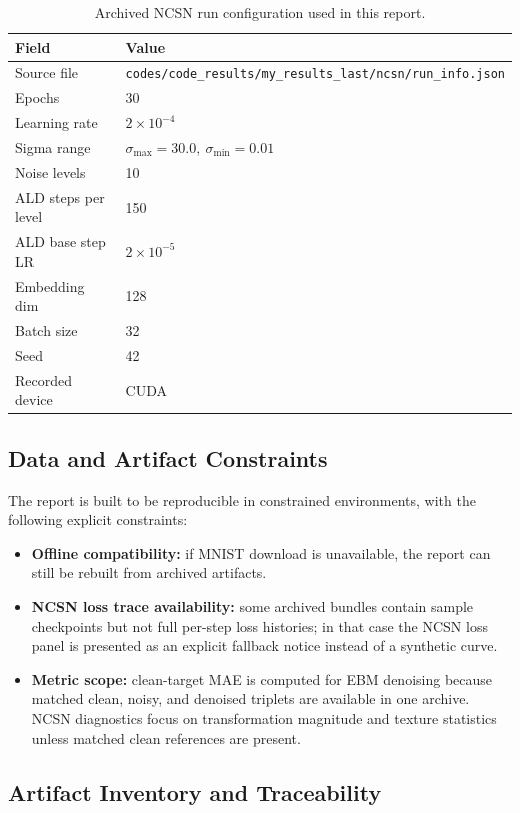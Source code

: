\begin{table}[H]
\centering
\caption{Archived NCSN run configuration used in this report.}
\label{tab:ncsn-archived-config}
\begin{tabular}{@{}ll@{}}
\toprule
\textbf{Field} & \textbf{Value} \\
\midrule
Source file & \texttt{codes/code\_results/my\_results\_last/ncsn/run\_info.json} \\
Epochs & 30 \\
Learning rate & $2\times 10^{-4}$ \\
Sigma range & $\sigma_{\max}=30.0,\ \sigma_{\min}=0.01$ \\
Noise levels & 10 \\
ALD steps per level & 150 \\
ALD base step LR & $2\times 10^{-5}$ \\
Embedding dim & 128 \\
Batch size & 32 \\
Seed & 42 \\
Recorded device & CUDA \\
\bottomrule
\end{tabular}
\end{table}

\subsection{Data and Artifact Constraints}

The report is built to be reproducible in constrained environments, with the
following explicit constraints:
\begin{itemize}[leftmargin=*]
  \item \textbf{Offline compatibility:} if MNIST download is unavailable, the
  report can still be rebuilt from archived artifacts.
  \item \textbf{NCSN loss trace availability:} some archived bundles contain
  sample checkpoints but not full per-step loss histories; in that case the
  NCSN loss panel is presented as an explicit fallback notice instead of a
  synthetic curve.
  \item \textbf{Metric scope:} clean-target MAE is computed for EBM denoising
  because matched clean, noisy, and denoised triplets are available in one
  archive. NCSN diagnostics focus on transformation magnitude and texture
  statistics unless matched clean references are present.
\end{itemize}

\subsection{Artifact Inventory and Traceability}

